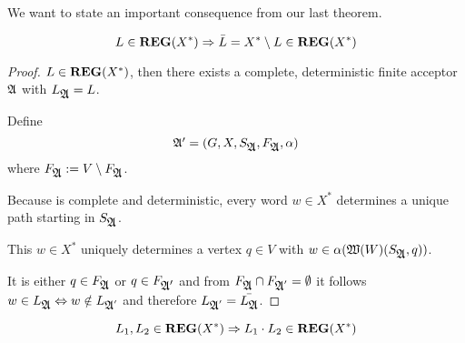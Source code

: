 We want to state an important consequence from our last theorem.

\begin{theorem}
\[ L \in \mbox{{\bf REG}}(X^*) \Rightarrow \bar{L} = X^* \setminus L \in \mbox{{\bf REG}}(X^*)
\]
\end{theorem}

\begin{proof}
$L \in \mbox{{\bf REG}}(X^*)$, then there exists a complete, deterministic finite
acceptor $\mbox{$\mathfrak{A}$}$ with $L_{\mbox{$\mathfrak{A}$}} = L$.

Define
\[ \mbox{$\mathfrak{A'}$} = (G, X, S_{\mbox{$\mathfrak{A}$}}, F_{\mbox{$\mathfrak{A}$}}, \alpha) \]
where $F_{\mbox{$\mathfrak{A}$}} := V \setminus F_{\mbox{$\mathfrak{A}$}}$.

Because  is complete and deterministic, every word $w \in X^*$ determines
a unique path starting in $S_{\mbox{$\mathfrak{A}$}}$.

This $w \in X^*$ uniquely determines a vertex $q \in V$ with $w \in
\alpha(\mbox{$\mathfrak{W}({W})$}(S_{\mbox{$\mathfrak{A}$}}, q))$.

It is either $q \in F_{\mbox{$\mathfrak{A}$}}$ or $q \in F_{\mbox{$\mathfrak{A'}$}}$ and from $F_{\mbox{$\mathfrak{A}$}}
\cap F_{\mbox{$\mathfrak{A}$}'} = \emptyset$ it follows $w \in L_{\mbox{$\mathfrak{A}$}} \Leftrightarrow w
\notin L_{\mbox{$\mathfrak{A}$}'}$ and therefore $L_{\mbox{$\mathfrak{A}$}'} = \bar{L_{\mbox{$\mathfrak{A}$}}}$.
\end{proof}

\bigskip
\begin{theorem}
\[ L_1, L_2 \in \mbox{{\bf REG}}(X^*) \Rightarrow L_1 \cdot L_2 \in \mbox{{\bf REG}}(X^*) \]
\end{theorem}

